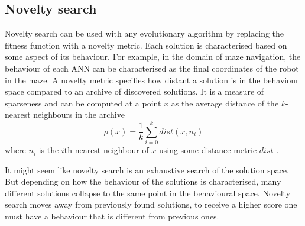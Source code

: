 \newpage
\subsection{Novelty search}
Novelty search can be used with any evolutionary algorithm by replacing the fitness
function with a novelty metric. Each solution is characterised based on some aspect
of its behaviour. For example, in the domain of maze navigation,
the behaviour of each ANN can be characterised as the
final coordinates of the robot in the maze. A novelty metric specifies how distant a solution
is in the behaviour space compared to an archive of discovered solutions. It is a measure
of sparseness and can be computed at a point $x$ as the average distance of the
$k$-nearest neighbours in the archive
\begin{equation}
    \rho(x) = \frac{1}{k} \sum_{i=0}^{k} dist(x, n_{i})
\end{equation}
where $n_{i}$ is the $i$th-nearest neighbour of $x$ using some distance metric $dist$ \cite{novelty_alone}.

It might seem like novelty search is an exhaustive search of the solution space. But
depending on how the behaviour of the solutions is characterised, many different solutions
collapse to the same point in the behavioural space. Novelty search moves away from previously found solutions,
to receive a higher score one must have a behaviour that is different from previous ones.

